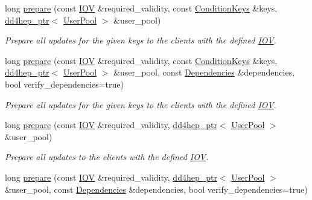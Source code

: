 \begin{DoxyCompactItemize}
long \hyperlink{class_d_d4hep_1_1_conditions_1_1_conditions_manager_a3f702bb3db03a4e7b947e8ed591f138b}{prepare} (const \hyperlink{class_d_d4hep_1_1_i_o_v}{IOV} \&required\_\-validity, const \hyperlink{class_d_d4hep_1_1_conditions_1_1_conditions_manager_a8dd76f9acef2c8d3b7970e266fe7eff6}{ConditionKeys} \&keys, \hyperlink{class_d_d4hep_1_1dd4hep__ptr}{dd4hep\_\-ptr}$<$ \hyperlink{class_d_d4hep_1_1_conditions_1_1_user_pool}{UserPool} $>$ \&user\_\-pool)
\begin{DoxyCompactList}\small\item\em Prepare all updates for the given keys to the clients with the defined \hyperlink{class_d_d4hep_1_1_i_o_v}{IOV}. \item\end{DoxyCompactList}\item 
long \hyperlink{class_d_d4hep_1_1_conditions_1_1_conditions_manager_a8b8e72ff8060db98ecbd19a6a05eafa6}{prepare} (const \hyperlink{class_d_d4hep_1_1_i_o_v}{IOV} \&required\_\-validity, const \hyperlink{class_d_d4hep_1_1_conditions_1_1_conditions_manager_a8dd76f9acef2c8d3b7970e266fe7eff6}{ConditionKeys} \&keys, \hyperlink{class_d_d4hep_1_1dd4hep__ptr}{dd4hep\_\-ptr}$<$ \hyperlink{class_d_d4hep_1_1_conditions_1_1_user_pool}{UserPool} $>$ \&user\_\-pool, const \hyperlink{class_d_d4hep_1_1_conditions_1_1_conditions_dependency_collection}{Dependencies} \&dependencies, bool verify\_\-dependencies=true)
\begin{DoxyCompactList}\small\item\em Prepare all updates for the given keys to the clients with the defined \hyperlink{class_d_d4hep_1_1_i_o_v}{IOV}. \item\end{DoxyCompactList}\item 
long \hyperlink{class_d_d4hep_1_1_conditions_1_1_conditions_manager_a16a1aa58d0a9d61d9bed50b16705a63e}{prepare} (const \hyperlink{class_d_d4hep_1_1_i_o_v}{IOV} \&required\_\-validity, \hyperlink{class_d_d4hep_1_1dd4hep__ptr}{dd4hep\_\-ptr}$<$ \hyperlink{class_d_d4hep_1_1_conditions_1_1_user_pool}{UserPool} $>$ \&user\_\-pool)
\begin{DoxyCompactList}\small\item\em Prepare all updates to the clients with the defined \hyperlink{class_d_d4hep_1_1_i_o_v}{IOV}. \item\end{DoxyCompactList}\item 
long \hyperlink{class_d_d4hep_1_1_conditions_1_1_conditions_manager_afb09828cf1420ca6a9abb815ccf7d06c}{prepare} (const \hyperlink{class_d_d4hep_1_1_i_o_v}{IOV} \&required\_\-validity, \hyperlink{class_d_d4hep_1_1dd4hep__ptr}{dd4hep\_\-ptr}$<$ \hyperlink{class_d_d4hep_1_1_conditions_1_1_user_pool}{UserPool} $>$ \&user\_\-pool, const \hyperlink{class_d_d4hep_1_1_conditions_1_1_conditions_dependency_collection}{Dependencies} \&dependencies, bool verify\_\-dependencies=true)

\end{DoxyCompactItemize}
